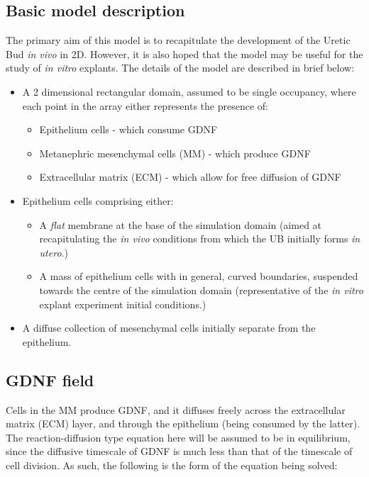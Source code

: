 \documentclass[pdftex,10pt,a4paper,twocolumn]{article}
\begin{document}
\subsection{Basic model description}
The primary aim of this model is to recapitulate the development of the Uretic Bud \textit{in vivo} in 2D. However, it is also hoped that the model may be useful for the study of \textit{in vitro} explants. The details of the model are described in brief below:
\begin{itemize}
\item A 2 dimensional rectangular domain, assumed to be single occupancy, where each point in the array either represents the presence of:
\begin{itemize}
\item Epithelium cells - which consume GDNF
\item Metanephric mesenchymal cells (MM) - which produce GDNF
\item Extracellular matrix (ECM) - which allow for free diffusion of GDNF
\end{itemize}
\item Epithelium cells comprising either:
\begin{itemize}
\item A \textit{flat} membrane at the base of the simulation domain (aimed at recapitulating the \textit{in vivo} conditions from which the UB initially forms \textit{in utero}.)
\item A mass of epithelium cells with in general, curved boundaries, suspended towards the centre of the simulation domain (representative of the \textit{in vitro} explant experiment initial conditions.)
\end{itemize}
\item A diffuse collection of mesenchymal cells initially separate from the epithelium.
\end{itemize}


\subsection{GDNF field}
Cells in the MM produce GDNF, and it diffuses freely across the extracellular matrix (ECM) layer, and through the epithelium (being consumed by the latter). The reaction-diffusion type equation here will be assumed to be in equilibrium, since the diffusive timescale of GDNF is much less than that of the timescale of cell division. As such, the following is the form of the equation being solved:
\end{document}
